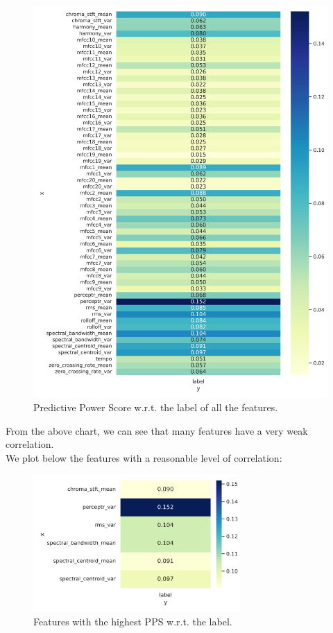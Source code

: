 \documentclass{Configuration_Files/PoliMi3i_thesis}
\begin{document}
\begin{figure}[H]
    \centering
    \includegraphics[width=\textwidth]{Figures/corr_all.png}
    \caption{Predictive Power Score w.r.t. the label of all the features.}
    \label{fig:corr_all}
\end{figure}

From the above chart, we can see that many features have a very weak correlation.  \\
We plot below the features with a reasonable level of correlation:

\begin{figure}[H]
    \centering
    \includegraphics[width=0.7\textwidth]{Figures/corr_high.png}
    \caption{Features with the highest PPS w.r.t. the label.}
    \label{fig:corr_high}
\end{figure}
\end{document}
